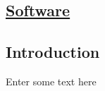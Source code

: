
\vspace*{8.5cm}

\begin{flushright}
	\section{\huge{\underline{Software}}}
\end{flushright}

\subsection{Introduction}
	Enter some text here
